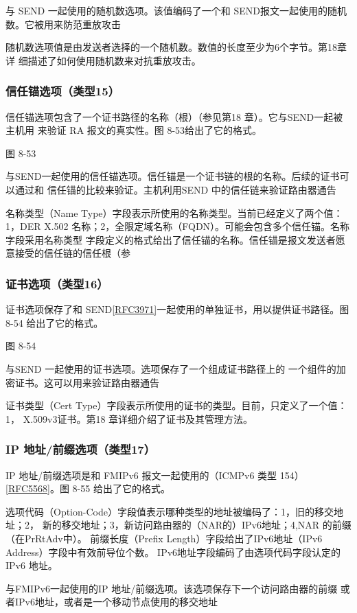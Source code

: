 与 SEND 一起使用的随机数选项。该值编码了一个和 SEND报文一起使用的随机数。它被用来防范重放攻击

随机数选项值是由发送者选择的一个随机数。数值的长度至少为6个字节。第18章详
细描述了如何使用随机数来对抗重放攻击。

\subsubsection{信任锚选项（类型15）}
信任锚选项包含了一个证书路径的名称（根）（参见第18 章）。它与SEND一起被主机用
来验证 RA 报文的真实性。图 8-53给出了它的格式。


图 8-53

与SEND一起使用的信任锚选项。信任锚是一个证书链的根的名称。后续的证书可以通过和
信任锚的比较来验证。主机利用SEND 中的信任链来验证路由器通告

名称类型（Name Type）字段表示所使用的名称类型。当前已经定义了两个值：1，DER
X.502 名称；2，全限定域名称（FQDN）。可能会包含多个信任锚。名称字段采用名称类型
字段定义的格式给出了信任锚的名称。信任锚是报文发送者愿意接受的信任链的信任根（参
\subsubsection{证书选项（类型16）}
证书选项保存了和 SEND\href{https://www.rfc-editor.org/rfc/rfc3971}{[RFC3971]}一起使用的单独证书，用以提供证书路径。图8-54
给出了它的格式。

图 8-54

与SEND 一起使用的证书选项。选项保存了一个组成证书路径上的
一个组件的加密证书。这可以用来验证路由器通告

证书类型（Cert Type）字段表示所使用的证书的类型。目前，只定义了一个值：1，
X.509v3证书。第18 章详细介绍了证书及其管理方法。

\subsubsection{IP 地址/前缀选项（类型17）}
IP 地址/前缀选项是和 FMIPv6 报文一起使用的（ICMPv6 类型 154）\href{https://www.rfc-editor.org/rfc/rfc5568}{[RFC5568]}。图
8-55 给出了它的格式。

选项代码（Option-Code）字段值表示哪种类型的地址被编码了：1，旧的移交地址；2，
新的移交地址；3，新访问路由器的（NAR的）IPv6地址；4,NAR 的前缀（在PrRtAdv中）。
前缀长度（Prefix Length）字段给出了IPv6地址（IPv6 Address）字段中有效前导位个数。
IPv6地址字段编码了由选项代码字段认定的 IPv6 地址。

与FMIPv6一起使用的IP 地址/前缀选项。该选项保存下一个访问路由器的前缀
或者IPv6地址，或者是一个移动节点使用的移交地址

